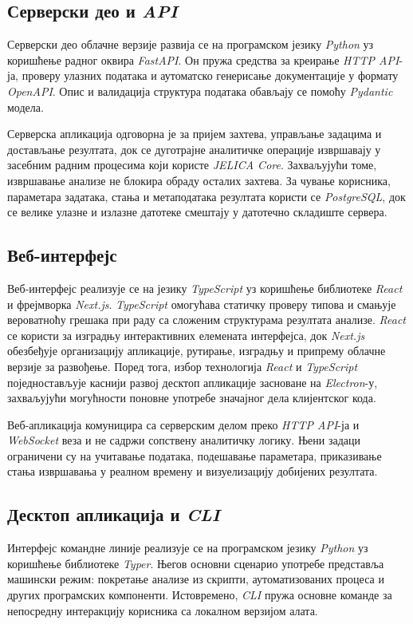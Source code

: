 \documentclass[12pt,oneside]{memoir}
\begin{document}
\subsection{Серверски део и \textit{API}}
Серверски део облачне верзије развија се на програмском језику \textit{Python} уз коришћење радног оквира \textit{FastAPI}. Он пружа средства за креирање \textit{HTTP API}-ја, проверу улазних података и аутоматско генерисање документације у формату \textit{OpenAPI}. Опис и валидација структура података обављају се помоћу \textit{Pydantic} модела.

Серверска апликација одговорна је за пријем захтева, управљање задацима и достављање резултата, док се дуготрајне аналитичке операције извршавају у засебним радним процесима који користе \textit{JELICA Core}. Захваљујући томе, извршавање анализе не блокира обраду осталих захтева. За чување корисника, параметара задатака, стања и метаподатака резултата користи се \textit{PostgreSQL}, док се велике улазне и излазне датотеке смештају у датотечно складиште сервера.


\subsection{Веб-интерфејс}
Веб-интерфејс реализује се на језику \textit{TypeScript} уз коришћење библиотеке \textit{React} и фрејмворка \textit{Next.js}. \textit{TypeScript} омогућава статичку проверу типова и смањује вероватноћу грешака при раду са сложеним структурама резултата анализе. \textit{React} се користи за изградњу интерактивних елемената интерфејса, док \textit{Next.js} обезбеђује организацију апликације, рутирање, изградњу и припрему облачне верзије за развођење. Поред тога, избор технологија \textit{React} и \textit{TypeScript} поједностављује каснији развој десктоп апликације засноване на \textit{Electron}-у, захваљујући могућности поновне употребе значајног дела клијентског кода.

Веб-апликација комуницира са серверским делом преко \textit{HTTP API}-ја и \textit{WebSocket} веза и не садржи сопствену аналитичку логику. Њени задаци ограничени су на учитавање података, подешавање параметара, приказивање стања извршавања у реалном времену и визуелизацију добијених резултата.


\subsection{Десктоп апликација и \textit{CLI}}
Интерфејс командне линије реализује се на програмском језику \textit{Python} уз коришћење библиотеке \textit{Typer}. Његов основни сценарио употребе представља машински режим: покретање анализе из скрипти, аутоматизованих процеса и других програмских компоненти. Истовремено, \textit{CLI} пружа основне команде за непосредну интеракцију корисника са локалном верзијом алата.
\end{document}
